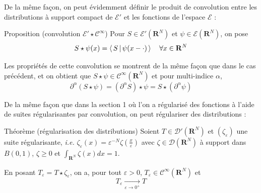         De la même façon, on peut évidemment définir le produit de convolution entre les distributions à support compact de $\mathcal{E}'$ et les fonctions de l’espace $\mathcal{E}$ :

        \begin{omed}{Proposition (convolution $\mathcal{E}' \star \mathcal{C}^{\infty}$)}
            Pour $S \in \mathcal{E}'(\mathbf{R}^N)$ et $\psi \in \mathcal{E}(\mathbf{R}^N)$, on pose 
            \[ S \star \psi(x) = \left< \, S \, \middle| \, \psi(x - \cdot) \, \right> \quad \forall x \in \mathbf{R}^N \]   
        \end{omed}

        Les propriétés de cette convolution se montrent de la même façon que dans le cas précédent, et on obtient que $S \star \psi \in \mathcal{C}^{\infty}(\mathbf{R}^N)$ et pour multi-indice $\alpha$, 
        \[ \partial^{\alpha} (S \star \psi) = (\partial^{\alpha} S) \star \psi  = S \star (\partial^{\alpha} \psi) \]   

        De la même façon que dans la section 1 où l’on a régularisé des fonctions à l’aide de suites régularisantes par convolution, on peut régulariser des distributions :

        \begin{omed}{Théorème (régularisation des distributions)}
            Soient $T \in \mathcal{D}'(\mathbf{R}^N)$ et $(\zeta_{\varepsilon})$ une suite régularisante, \textit{i.e.} $\zeta_{\varepsilon}(x) = \varepsilon^{-N} \zeta\left(\frac{x}{\varepsilon}\right)$ avec $\zeta \in \mathcal{D}(\mathbf{R}^N)$ à support dans $B(0,1)$, $\zeta \geq 0$ et $\int_{\mathbf{R}^N}\zeta(x)dx = 1$. 

            En posant $T_{\varepsilon} = T \star \zeta_{\varepsilon}$, on a, pour tout $\varepsilon > 0$, $T_{\varepsilon} \in \mathcal{C}^{\infty}(\mathbf{R}^N)$ et 
            \[ T_{\varepsilon} \underset{\varepsilon \to 0^+}{\longrightarrow} T \]
        \end{omed}

